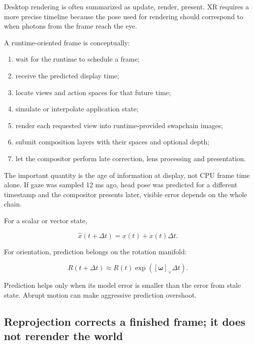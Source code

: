Desktop rendering is often summarized as update, render, present. XR requires a more precise timeline because the pose used for rendering should correspond to when photons from the frame reach the eye.

A runtime-oriented frame is conceptually:

\begin{enumerate}
\def\labelenumi{\arabic{enumi}.}
\tightlist
\item
  wait for the runtime to schedule a frame;
\item
  receive the predicted display time;
\item
  locate views and action spaces for that future time;
\item
  simulate or interpolate application state;
\item
  render each requested view into runtime-provided swapchain images;
\item
  submit composition layers with their spaces and optional depth;
\item
  let the compositor perform late correction, lens processing and presentation.
\end{enumerate}

The important quantity is the age of information at display, not CPU frame time alone. If gaze was sampled 12 ms ago, head pose was predicted for a different timestamp and the compositor presents later, visible error depends on the whole chain.

For a scalar or vector state,

\[
\hat{x}(t+\Delta t)=x(t)+\dot{x}(t)\Delta t.
\]

For orientation, prediction belongs on the rotation manifold:

\[
R(t+\Delta t)\approx R(t)\exp([\boldsymbol\omega]_\times\Delta t).
\]

Prediction helps only when its model error is smaller than the error from stale state. Abrupt motion can make aggressive prediction overshoot.

\subsection{Reprojection corrects a finished frame; it does not rerender the world}\label{04-visual-computing-ii-ch035-reprojection-corrects-a-finished-frame-it-does-not-rerender-the-world}

\hypertarget{04-visual-computing-ii-ch035-reprojection-corrects-a-finished-frame-it-does-not-rerender-the-world}{}

